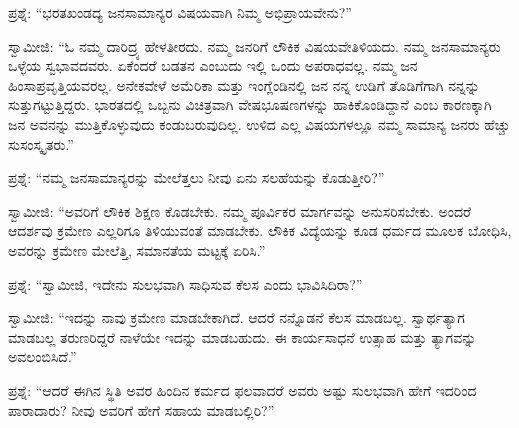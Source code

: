 \vskip 4pt

ಪ್ರಶ್ನೆ: “ಭರತಖಂಡದ್ಯ ಜನಸಾಮಾನ್ಯರ ವಿಷಯವಾಗಿ ನಿಮ್ಮ ಅಭಿಪ್ರಾಯವೇನು?”

\vskip 4pt

ಸ್ವಾಮೀಜಿ: “ಓ ನಮ್ಮ ದಾರಿದ್ರ್ಯ ಹೇಳತೀರದು. ನಮ್ಮ ಜನರಿಗೆ ಲೌಕಿಕ ವಿಷಯವೇ\break ತಿಳಿಯದು. ನಮ್ಮ ಜನಸಾಮಾನ್ಯರು ಒಳ್ಳೆಯ ಸ್ವಭಾವದವರು. ಏಕೆಂದರೆ ಬಡತನ ಎಂಬುದು ಇಲ್ಲಿ ಒಂದು ಅಪರಾಧವಲ್ಲ. ನಮ್ಮ ಜನ ಹಿಂಸಾಪ್ರವೃತ್ತಿಯವರಲ್ಲ. ಅನೇಕವೇಳೆ ಅಮೆರಿಕಾ ಮತ್ತು ಇಂಗ್ಲೆಂಡಿನಲ್ಲಿ ಜನ ನನ್ನ ಉಡಿಗೆ ತೊಡಿಗೆಗಾಗಿ ನನ್ನನ್ನು ಸುತ್ತುಗಟ್ಟುತ್ತಿದ್ದರು. ಭಾರತದಲ್ಲಿ ಒಬ್ಬನು ವಿಚಿತ್ರವಾಗಿ ವೇಷಭೂಷಣಗಳನ್ನು ಹಾಕಿಕೊಂಡಿದ್ದಾನೆ ಎಂಬ ಕಾರಣಕ್ಕಾಗಿ ಜನ ಅವನನ್ನು ಮುತ್ತಿಕೊಳ್ಳುವುದು ಕಂಡುಬರುವುದಿಲ್ಲ. ಉಳಿದ ಎಲ್ಲ ವಿಷಯಗಳಲ್ಲೂ ನಮ್ಮ ಸಾಮಾನ್ಯ ಜನರು ಹೆಚ್ಚು ಸುಸಂಸ್ಕೃತರು.”

\vskip 4pt

ಪ್ರಶ್ನೆ: “ನಮ್ಮ ಜನಸಾಮಾನ್ಯರನ್ನು ಮೇಲೆತ್ತಲು ನೀವು ಏನು ಸಲಹೆಯನ್ನು ಕೊಡುತ್ತೀರಿ?”

\vskip 4pt

ಸ್ವಾಮೀಜಿ: “ಅವರಿಗೆ ಲೌಕಿಕ ಶಿಕ್ಷಣ ಕೊಡಬೇಕು. ನಮ್ಮ ಪೂರ್ವಿಕರ ಮಾರ್ಗವನ್ನು ಅನುಸರಿಸಬೇಕು. ಅಂದರೆ ಆದರ್ಶವು ಕ್ರಮೇಣ ಎಲ್ಲರಿಗೂ ತಿಳಿಯುವಂತೆ ಮಾಡಬೇಕು. ಲೌಕಿಕ ವಿದ್ಯೆಯನ್ನು ಕೂಡ ಧರ್ಮದ ಮೂಲಕ ಬೋಧಿಸಿ, ಅವರನ್ನು ಕ್ರಮೇಣ ಮೇಲೆತ್ತಿ, ಸಮಾನತೆಯ ಮಟ್ಟಕ್ಕೆ ಏರಿಸಿ.”

\vskip 4pt

ಪ್ರಶ್ನೆ: “ಸ್ವಾಮೀಜಿ, ಇದೇನು ಸುಲಭವಾಗಿ ಸಾಧಿಸುವ ಕೆಲಸ ಎಂದು ಭಾವಿಸಿದಿರಾ?”

\vskip 4pt

ಸ್ವಾಮೀಜಿ: “ಇದನ್ನು ನಾವು ಕ್ರಮೇಣ ಮಾಡಬೇಕಾಗಿದೆ. ಆದರೆ ನನ್ನೊಡನೆ ಕೆಲಸ ಮಾಡಬಲ್ಲ. ಸ್ವಾರ್ಥತ್ಯಾಗ ಮಾಡಬಲ್ಲ ತರುಣರಿದ್ದರೆ ನಾಳೆಯೇ ಇದನ್ನು ಮಾಡಬಹುದು. ಈ ಕಾರ್ಯಸಾಧನೆ ಉತ್ಸಾಹ ಮತ್ತು ತ್ಯಾಗವನ್ನು ಅವಲಂಬಿಸಿದೆ.”

\vskip 4pt

ಪ್ರಶ್ನೆ: “ಆದರೆ ಈಗಿನ ಸ್ಥಿತಿ ಅವರ ಹಿಂದಿನ ಕರ್ಮದ ಫಲವಾದರೆ ಅವರು ಅಷ್ಟು ಸುಲಭವಾಗಿ ಹೇಗೆ ಇದರಿಂದ ಪಾರಾದಾರು? ನೀವು ಅವರಿಗೆ ಹೇಗೆ ಸಹಾಯ ಮಾಡಬಲ್ಲಿರಿ?”

\vskip 4pt

